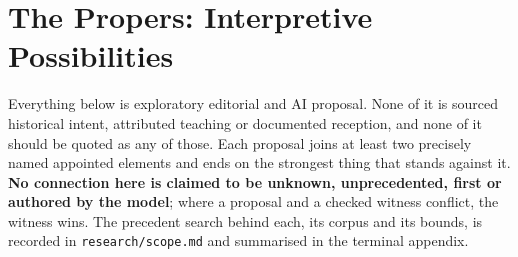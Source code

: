\sectionguard
\section*{The Propers: Interpretive Possibilities}

\begin{studyframe}
Everything below is exploratory editorial and AI proposal. None of it is sourced
historical intent, attributed teaching or documented reception, and none of it
should be quoted as any of those. Each proposal joins at least two precisely named
appointed elements and ends on the strongest thing that stands against it.
\textbf{No connection here is claimed to be unknown, unprecedented, first or
authored by the model}; where a proposal and a checked witness conflict, the
witness wins. The precedent search behind each, its corpus and its bounds, is
recorded in \texttt{research/scope.md} and summarised in the terminal appendix.
\end{studyframe}

